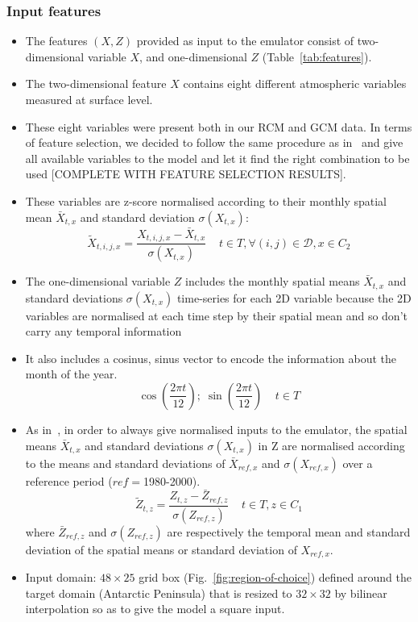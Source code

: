 \documentclass[a4paper,11pt,oneside]{report}
\begin{document}
\subsubsection{Input features}
\begin{itemize}
    \item The features $(X, Z)$ provided as input to the emulator consist of two-dimensional variable $X$, and one-dimensional $Z$ (Table~\ref{tab:features}). 
    \item The two-dimensional feature $X$ contains eight different atmospheric variables measured at surface level. \item These eight variables were present both in our RCM and GCM data. In terms of feature selection, we decided to follow the same procedure as in~\cite{Doury} and give all available variables to the model and let it find the right combination to be used [COMPLETE WITH FEATURE SELECTION RESULTS]. 
    \item These variables are z-score normalised according to their monthly spatial mean $\bar{X}_{t,x}$ and standard deviation $\sigma(X_{t,x})$:
    \begin{equation}\label{eq:normalisation-X}
    \tilde{X}_{t,i,j,x} = \frac{X_{t,i,j,x}-\bar{X}_{t,x}}{\sigma(X_{t,x})} \;\;\;\; t\in T, \forall (i,j) \in \mathcal{D}, x\in C_2
\end{equation}

\item The one-dimensional variable $Z$ includes the monthly spatial means $\bar{X}_{t,x}$ and standard deviations $\sigma(X_{t,x})$ time-series for each 2D variable because the 2D variables are normalised at each time step by their spatial mean and so don’t carry any temporal information
\item It also includes a cosinus, sinus vector to encode the information about the month of the year.
\begin{equation}
    \operatorname{cos}\left(\frac{2\pi t}{12}\right);\; \operatorname{sin}\left(\frac{2\pi t}{12}\right) \;\;\;\; t\in T
\end{equation}
\item As in~\cite{Doury}, in order to always give normalised inputs to the emulator, the spatial means $\bar{X}_{t,x}$ and standard deviations $\sigma(X_{t,x})$ in Z are normalised according to the means and standard deviations of $\bar{X}_{ref,x}$ and $\sigma(X_{ref,x})$ over a reference period ($ref=$1980-2000).
\begin{equation}\label{eq:normalisation-Z}
    \tilde{Z}_{t,z} = \frac{Z_{t,z}-\bar{Z}_{ref,z}}{\sigma(Z_{ref,z})} \;\;\;\; t\in T, z\in C_1
\end{equation}
where $\bar{Z}_{ref,z}$ and $\sigma(Z_{ref,z})$ are respectively the temporal mean and standard deviation of the spatial means or standard deviation of $X_{ref, x}$.

\item Input domain: $48\times25$ grid box (Fig.~\ref{fig:region-of-choice}) defined around the target domain (Antarctic Peninsula) that is resized to $32\times 32$ by bilinear interpolation so as to give the model a square input.
\end{itemize}
\end{document}

